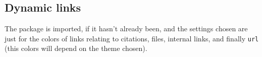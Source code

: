 \documentclass{tutodoc}
\begin{document}
\subsection{Dynamic links}

The  package is imported, if it hasn't already been, and the settings chosen are just for the colors of links relating to citations, files, internal links, and finally \verb#url# (this colors will depend on the theme chosen).
\end{document}
